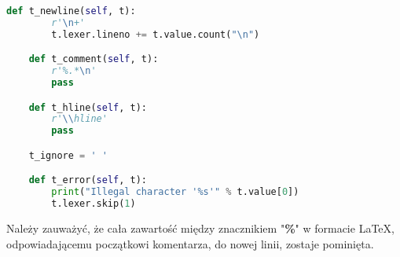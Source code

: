 \begin{lstlisting}[language={Python}, caption={Pozostałe tokeny}, label={analiza-leksykalna-pozostale}]
    def t_newline(self, t):
        r'\n+'
        t.lexer.lineno += t.value.count("\n")

    def t_comment(self, t):
        r'%.*\n'
        pass

    def t_hline(self, t):
        r'\\hline'
        pass

    t_ignore = ' '

    def t_error(self, t):
        print("Illegal character '%s'" % t.value[0])
        t.lexer.skip(1)
\end{lstlisting}

Należy zauważyć, że cała zawartość między znacznikiem "\textbf{\%}" w formacie \LaTeX, odpowiadającemu początkowi komentarza, do nowej linii, 
zostaje pominięta.